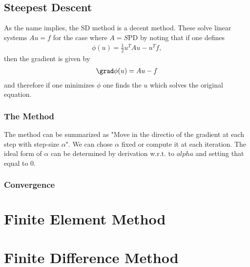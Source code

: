 \subsection{Steepest Descent}
As the name implies, the SD method is a decent method. These solve linear systems $Au=f$ for the case where $A=S$PD by noting that if one defines
\begin{align}
  \phi(u) = \frac{1}{2}u^TAu - u^Tf,
\end{align}
then the gradient is given by
\begin{align}
  \grad \phi(u) = Au-f
\end{align}
and therefore if one minimizes $\phi$ one finds the $u$ which solves the original equation.

\subsubsection{The Method}
The method can be summarized as "Move in the directio  of the gradient at each step with step-size $\alpha$".
We can chose $\alpha$ fixed or compute it at each iteration. The ideal form of $\alpha$ can be determined by derivation w.r.t. to $alpha$ and setting that equal to 0.

\subsubsection{Convergence}

\section{Finite Element Method}
\section{Finite Difference Method}

